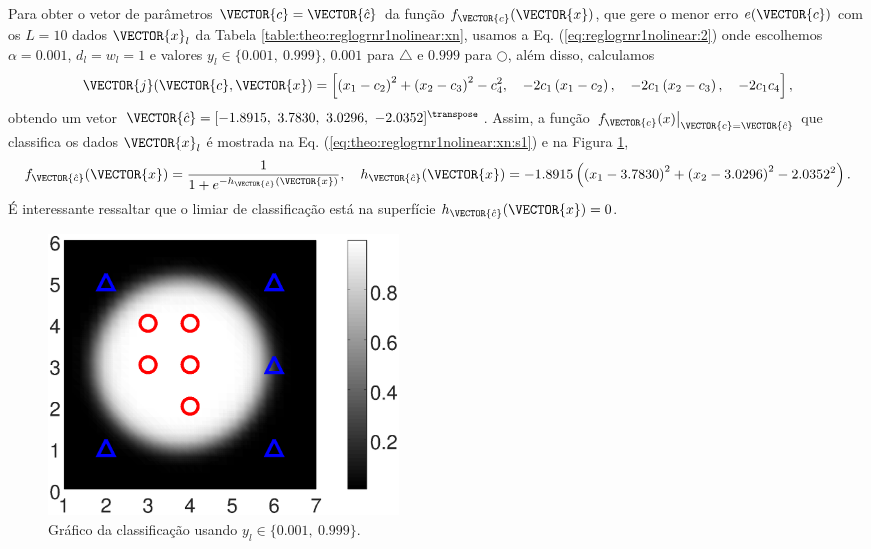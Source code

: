 \begin{SolutionT}\label{sol:theo:reglogrnr1nolinear:s1}
Para obter o vetor de parâmetros $\VECTOR{c}=\VECTOR{\hat{c}}$ da função $f_{\VECTOR{c}}(\VECTOR{x})$, 
que gere o menor erro $e(\VECTOR{c})$
com os $L=10$ dados $\VECTOR{x}_l$ da Tabela \ref{table:theo:reglogrnr1nolinear:xn},
usamos a Eq. (\ref{eq:reglogrnr1nolinear:2}) onde escolhemos $\alpha=0.001$, $d_l=w_l=1$ e valores $y_l \in \{0.001,~ 0.999\}$,
$0.001$ para $\bigtriangleup$ e $0.999$ para $\bigcirc$,
além disso, calculamos 
\begin{equation}
\VECTOR{j}(\VECTOR{c},\VECTOR{x}) = 
\left[ 
\left(x_1-c_2\right)^2 + \left(x_2-c_3\right)^2 -c_4^2, \quad 
-2c_1\left(x_1-c_2\right), \quad
-2c_1\left(x_2-c_3\right), \quad
-2c_1c_4
\right],
\end{equation}
obtendo um vetor $\VECTOR{\hat{c}}=[-1.8915,~ 3.7830,~ 3.0296,~ -2.0352]^{\transpose}$.
Assim, a função $\left.f_{\VECTOR{c}}(x)\right|_{\VECTOR{c}=\VECTOR{\hat{c}}}$ que classifica os dados $\VECTOR{x}_l$
é mostrada na Eq. (\ref{eq:theo:reglogrnr1nolinear:xn:s1}) e na Figura \ref{fig:theo:reglogrnr1nolinear:xn:s1},
\begin{equation}\label{eq:theo:reglogrnr1nolinear:xn:s1}
f_{\VECTOR{\hat{c}}}(\VECTOR{x})= \frac{1}{1+e^{-h_{\VECTOR{\hat{c}}}(\VECTOR{x})}},
\quad
h_{\VECTOR{\hat{c}}}(\VECTOR{x}) = -1.8915\left( \left(x_1-3.7830\right)^2 + \left(x_2-3.0296\right)^2 -2.0352^2\right).\\
\end{equation}
É interessante ressaltar que o limiar de classificação está na superfície $h_{\VECTOR{\hat{c}}}(\VECTOR{x})=0$.
\end{SolutionT}
\begin{figure}[!h]
        \centering
        \includegraphics[width=0.45\textwidth]{chapters/classificacao/mfiles/reglogrnr1nolinear/ex1s2-reglogrnr1nolinear.eps}
        \caption{Gráfico da classificação usando $y_l \in \{0.001,~ 0.999\}$.}
        \label{fig:theo:reglogrnr1nolinear:xn:s1}
\end{figure}



